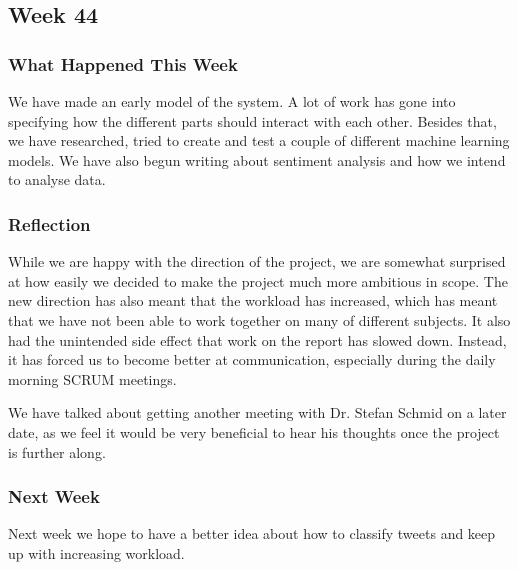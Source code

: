 \subsection{Week 44}
\subsubsection{What Happened This Week}
We have made an early model of the system. A lot of work has gone into
specifying how the different parts should interact with each other. Besides that,
we have researched, tried to create and test a couple of different machine
learning models. We have also begun writing about sentiment analysis and how we
intend to analyse data.

\subsubsection{Reflection}
While we are happy with the direction of the project, we are somewhat surprised
at how easily we decided to make the project much more ambitious in scope. The
new direction has also meant that the workload has increased, which has meant
that we have not been able to work together on many of different subjects. It
also had the unintended side effect that work on the report has slowed down.
Instead, it has forced us to become better at communication, especially during
the daily morning SCRUM meetings.\nl

We have talked about getting another meeting with Dr. Stefan Schmid on a later
date, as we feel it would be very beneficial to hear his thoughts once the
project is further along.

\subsubsection{Next Week} 
Next week we hope to have a better idea about how to classify tweets and
keep up with increasing workload.

